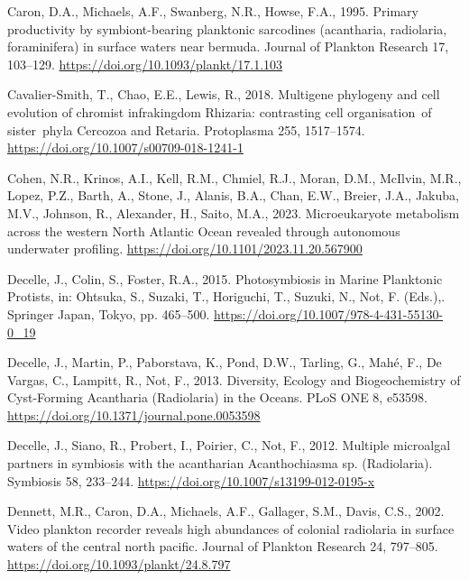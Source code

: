 \documentclass[
  letterpaper,
  DIV=11,
  numbers=noendperiod]{scrartcl}
\newlength{\cslhangindent}
\newlength{\cslentryspacingunit} %
\newenvironment{CSLReferences}[2] %
 {%
  \setlength{\parindent}{0pt}
  \ifodd #1
  \let\oldpar\par
  \def\par{\hangindent=\cslhangindent\oldpar}
  \fi
  \setlength{\parskip}{#2\cslentryspacingunit}
 }%
 {}
\begin{document}
\begin{CSLReferences}{1}{0}
\leavevmode{}%
Caron, D.A., Michaels, A.F., Swanberg, N.R., Howse, F.A., 1995. Primary
productivity by symbiont-bearing planktonic sarcodines (acantharia,
radiolaria, foraminifera) in surface waters near bermuda. Journal of
Plankton Research 17, 103--129.
\url{https://doi.org/10.1093/plankt/17.1.103}

\leavevmode{}%
Cavalier-Smith, T., Chao, E.E., Lewis, R., 2018. Multigene phylogeny and
cell evolution of chromist infrakingdom Rhizaria: contrasting cell
organisation~of sister~phyla Cercozoa and Retaria. Protoplasma 255,
1517--1574. \url{https://doi.org/10.1007/s00709-018-1241-1}

\leavevmode{}%
Cohen, N.R., Krinos, A.I., Kell, R.M., Chmiel, R.J., Moran, D.M.,
McIlvin, M.R., Lopez, P.Z., Barth, A., Stone, J., Alanis, B.A., Chan,
E.W., Breier, J.A., Jakuba, M.V., Johnson, R., Alexander, H., Saito,
M.A., 2023. Microeukaryote metabolism across the western North Atlantic
Ocean revealed through autonomous underwater profiling.
\url{https://doi.org/10.1101/2023.11.20.567900}

\leavevmode{}%
Decelle, J., Colin, S., Foster, R.A., 2015. Photosymbiosis in Marine
Planktonic Protists, in: Ohtsuka, S., Suzaki, T., Horiguchi, T., Suzuki,
N., Not, F. (Eds.),. Springer Japan, Tokyo, pp. 465--500.
\url{https://doi.org/10.1007/978-4-431-55130-0_19}

\leavevmode{}%
Decelle, J., Martin, P., Paborstava, K., Pond, D.W., Tarling, G., Mahé,
F., De Vargas, C., Lampitt, R., Not, F., 2013. Diversity, Ecology and
Biogeochemistry of Cyst-Forming Acantharia (Radiolaria) in the Oceans.
PLoS ONE 8, e53598. \url{https://doi.org/10.1371/journal.pone.0053598}

\leavevmode{}%
Decelle, J., Siano, R., Probert, I., Poirier, C., Not, F., 2012.
Multiple microalgal partners in symbiosis with the acantharian
Acanthochiasma sp. (Radiolaria). Symbiosis 58, 233--244.
\url{https://doi.org/10.1007/s13199-012-0195-x}

\leavevmode{}%
Dennett, M.R., Caron, D.A., Michaels, A.F., Gallager, S.M., Davis, C.S.,
2002. Video plankton recorder reveals high abundances of colonial
radiolaria in surface waters of the central north pacific. Journal of
Plankton Research 24, 797--805.
\url{https://doi.org/10.1093/plankt/24.8.797}


\end{CSLReferences}
\end{document}
